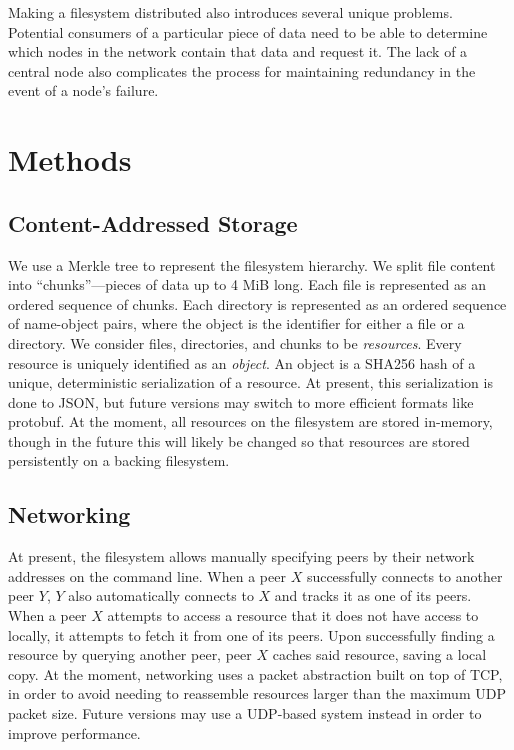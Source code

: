 \documentclass[twocolumn]{article}
\begin{document}
Making a filesystem distributed also introduces several unique problems.
Potential consumers of a particular piece of data need to be able to determine which nodes in the network contain that data and request it.
The lack of a central node also complicates the process for maintaining redundancy in the event of a node's failure.

\section{Methods}

\subsection{Content-Addressed Storage}

We use a Merkle tree to represent the filesystem hierarchy.
We split file content into ``chunks''—pieces of data up to 4 MiB long.
Each file is represented as an ordered sequence of chunks.
Each directory is represented as an ordered sequence of name-object pairs, where the object is the identifier for either a file or a directory.
We consider files, directories, and chunks to be \textit{resources}.
Every resource is uniquely identified as an \textit{object}.
An object is a SHA256 hash of a unique, deterministic serialization of a resource.
At present, this serialization is done to JSON, but future versions may switch to more efficient formats like protobuf.
At the moment, all resources on the filesystem are stored in-memory, though in the future this will likely be changed so that resources are stored persistently on a backing filesystem.

\subsection{Networking}

At present, the filesystem allows manually specifying peers by their network addresses on the command line.
When a peer $X$ successfully connects to another peer $Y$, $Y$ also automatically connects to $X$ and tracks it as one of its peers.
When a peer $X$ attempts to access a resource that it does not have access to locally, it attempts to fetch it from one of its peers.
Upon successfully finding a resource by querying another peer, peer $X$ caches said resource, saving a local copy.
At the moment, networking uses a packet abstraction built on top of TCP, in order to avoid needing to reassemble resources larger than the maximum UDP packet size.
Future versions may use a UDP-based system instead in order to improve performance. %
\end{document}
